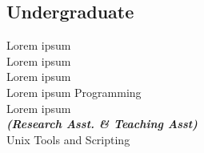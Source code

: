 \documentclass[]{Resume_Piyush}
\begin{document}
\begin{minipage}[t]{0.33\textwidth}
\subsection{Undergraduate}
Lorem ipsum \\
Lorem ipsum \\
Lorem ipsum \\
Lorem ipsum Programming \\
Lorem ipsum \\
{\footnotesize \textit{\textbf{(Research Asst. \& Teaching Asst) }}} \\
Unix Tools and Scripting \\
\sectionsep

%
%

\end{minipage} 
\hfill
\end{document}
